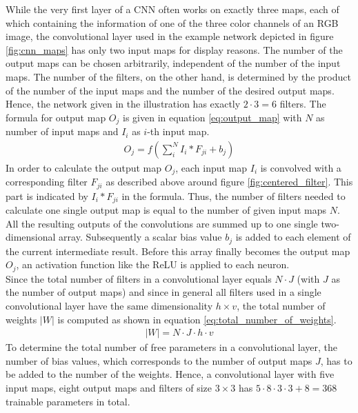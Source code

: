\documentclass[11pt, a4paper]{article}
\newcommand\abs[1]{\left|#1\right|}
\begin{document}
While the very first layer of a \ac{CNN} often works on exactly three maps, each of which containing the information of one of the three color channels of an \ac{RGB} image, the convolutional layer used in the example network depicted in figure \ref{fig:cnn_maps} has only two input maps for display reasons. The number of the output maps can be chosen arbitrarily, independent of the number of the input maps. The number of the filters, on the other hand, is determined by the product of the number of the input maps and the number of the desired output maps. Hence, the network given in the illustration has exactly $2 \cdot 3 = 6$ filters. The formula for output map $O_j$ is given in equation \eqref{eq:output_map} with $N$ as number of input maps and $I_i$ as $i$-th input map.
\begin{align}
\label{eq:output_map}
O_j = f \left( \sum_i^{N} I_i * F_{ji} + b_j \right)
\end{align}
In order to calculate the output map $O_j$, each input map $I_i$ is convolved with a corresponding filter $F_{ji}$ as described above around figure \ref{fig:centered_filter}. This part is indicated by $I_i * F_{ji}$ in the formula. Thus, the number of filters needed to calculate one single output map is equal to the number of given input maps $N$. All the resulting outputs of the convolutions are summed up to one single two-dimensional array. Subsequently a scalar bias value $b_j$ is added to each element of the current intermediate result. Before this array finally becomes the output map $O_j$, an activation function like the \ac{ReLU} is applied to each neuron.\\
Since the total number of filters in a convolutional layer equals $N \cdot J$ (with $J$ as the number of output maps) and since in general all filters used in a single convolutional layer have the same dimensionality $h \times v$, the total number of weights $\abs{W}$ is computed as shown in equation \eqref{eq:total_number_of_weights}.
\begin{align}
\label{eq:total_number_of_weights}
\abs{W} = N \cdot J \cdot h \cdot v
\end{align}
To determine the total number of free parameters in a convolutional layer, the number of bias values, which corresponds to the number of output maps $J$, has to be added to the number of the weights. Hence, a convolutional layer with five input maps, eight output maps and filters of size $3\times 3$ has $5 \cdot 8 \cdot 3 \cdot 3 +  8 = 368$ trainable parameters in total.
\end{document}
